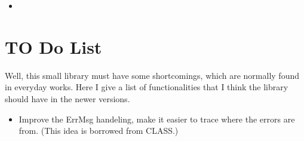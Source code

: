 \documentclass[a4paper,11pt]{article}
\newcommand{\insertcode}[2]{\begin{itemize}\item[]\end{itemize}}
\begin{document}

\insertcode{"../examples/gaussian.cpp"}{Example of a multi-dimensional Gaussian likelihood distribution.} %


\section{TO Do List}
Well, this small library must have some shortcomings, which are normally found in everyday works. Here I give
a list of functionalities that I think the library should have in the newer versions.

\begin{itemize}
\item Improve the ErrMsg handeling, make it easier to trace where the errors are from. (This idea is borrowed from CLASS.)
\end{itemize}
\end{document}
